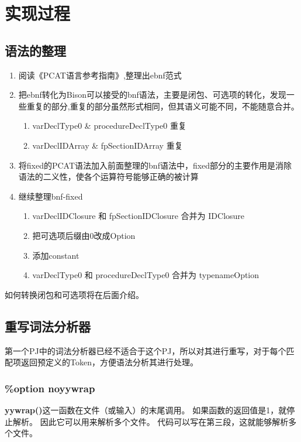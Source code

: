 \documentclass{article}
\begin{document}

\section{实现过程}

\subsection{语法的整理}

\begin{enumerate}
	\item 阅读《PCAT语言参考指南》,整理出ebnf范式
	\item 把ebnf转化为Bison可以接受的bnf语法，主要是闭包、可选项的转化，发现一些重复的部分,重复的部分虽然形式相同，但其语义可能不同，不能随意合并。
		\begin{enumerate}
			\item varDeclType0 \& procedureDeclType0 重复
			\item varDeclIDArray \& fpSectionIDArray 重复
		\end{enumerate}
	\item 将fixed的PCAT语法加入前面整理的bnf语法中，fixed部分的主要作用是消除语法的二义性，使各个运算符号能够正确的被计算
	\item 继续整理bnf-fixed
		\begin{enumerate}
			\item varDeclIDClosure 和 fpSectionIDClosure 合并为 IDClosure
			\item 把可选项后缀由0改成Option
			\item 添加constant
			\item varDeclType0 和 procedureDeclType0 合并为 typenameOption
		\end{enumerate}
\end{enumerate}

	如何转换闭包和可选项将在后面介绍。

\subsection{重写词法分析器}

第一个PJ中的词法分析器已经不适合于这个PJ，所以对其进行重写，对于每个匹配项返回预定义的Token，方便语法分析其进行处理。
	\subsubsection{\%option noyywrap}
	\textbf{yywrap()}这一函数在文件（或输入）的末尾调用。 如果函数的返回值是1，就停止解析。 因此它可以用来解析多个文件。 代码可以写在第三段，这就能够解析多个文件。
	
\end{document}

